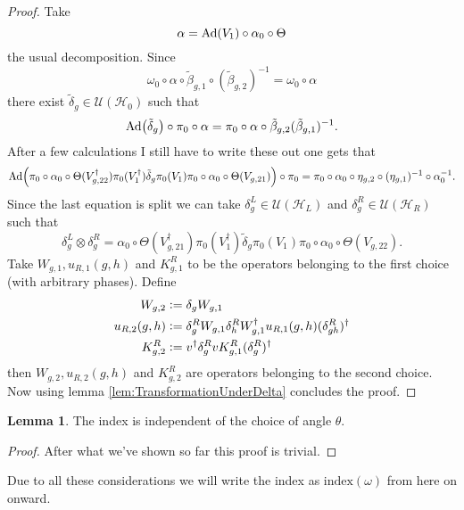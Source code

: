 \documentclass[12pt,a4paper,twoside]{article}
\newcommand{\defeq}{\vcentcolon=}
\let\originalleft\left
\let\originalright\right
\renewcommand{\left}{\mathopen{}\mathclose\bgroup\originalleft}
\renewcommand{\right}{\aftergroup\egroup\originalright}
\newcommand{\UU}{\mathcal U}
\newcommand{\HH}{\mathcal H}
\newcommand{\Ad}[1]{\textrm{Ad}\left(#1\right)}
\theoremstyle{definition}
\newtheorem{lemma}[theorem]{Lemma}
\numberwithin{equation}{section}
\begin{document}
\begin{proof}
	Take 
	\begin{equation}
		\alpha=\Ad{V_1}\circ\alpha_{0}\circ\Theta
	\end{equation}
	the usual decomposition. Since
	\begin{equation}
		\omega_0\circ\alpha\circ\tilde{\beta}_{g,1}\circ(\tilde{\beta}_{g,2})^{-1}=\omega_0\circ\alpha
	\end{equation}
	there exist $\tilde{\delta}_g\in\UU(\HH_0)$ such that
	\begin{equation}
		\Ad{\tilde{\delta}_g}\circ\pi_0\circ\alpha=\pi_0\circ\alpha\circ\tilde{\beta}_{g,2}(\tilde{\beta}_{g,1})^{-1}.
	\end{equation}
	After a few calculations {\color{red}I still have to write these out} one gets that
	\begin{equation}
		\Ad{\pi_0\circ\alpha_0\circ\Theta(V_{g,22}^\dagger)\pi_0(V_1^\dagger)\tilde{\delta}_g\pi_0(V_1)\pi_0\circ\alpha_0\circ\Theta(V_{g,21})}\circ\pi_0=\pi_0\circ\alpha_0\circ\eta_{g,2}\circ(\eta_{g,1})^{-1}\circ\alpha_0^{-1}.
	\end{equation}
	Since the last equation is split we can take $\delta_g^L\in\UU(\HH_L)$ and $\delta_g^R\in\UU(\HH_R)$ such that
	\begin{equation}
		\delta_g^L\otimes\delta_g^R=\alpha_0\circ\Theta(V_{g,21}^\dagger)\pi_0(V_1^\dagger)\tilde{\delta}_g\pi_0(V_1)\pi_0\circ\alpha_0\circ\Theta(V_{g,22}).
	\end{equation}
	Take $W_{g,1},u_{R,1}(g,h)$ and $K^R_{g,1}$ to be the operators belonging to the first choice (with arbitrary phases). Define
	\begin{align}
		W_{g,2}&\defeq\delta_g W_{g,1}\\
		u_{R,2}(g,h)&\defeq \delta_g^R W_{g,1}\delta_h^R W_{g,1}^\dagger u_{R,1}(g,h)(\delta_{gh}^R)^\dagger\\
		K^R_{g,2}&\defeq v^\dagger \delta_g^R v K_{g,1}^R (\delta_g^R)^\dagger
	\end{align}
	then $W_{g,2},u_{R,2}(g,h)$ and $K^R_{g,2}$ are operators belonging to the second choice. Now using lemma \ref{lem:TransformationUnderDelta} concludes the proof.
\end{proof}
\begin{lemma}
	The index is independent of the choice of angle $\theta$.
\end{lemma}
\begin{proof}
	After what we've shown so far this proof is trivial.
\end{proof}
Due to all these considerations we will write the index as $\textrm{index}(\omega)$ from here on onward.
\end{document}
